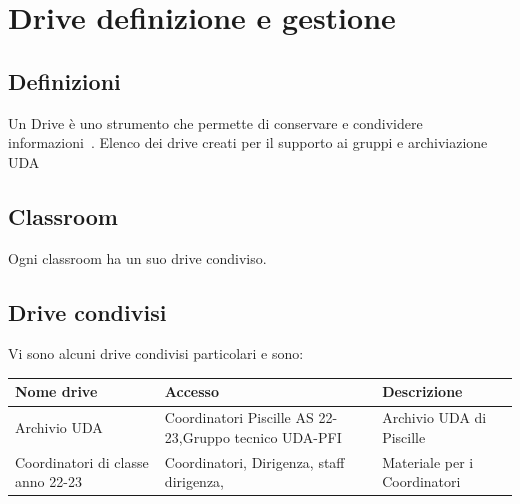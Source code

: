 \chapter{Drive definizione e gestione}
\section{Definizioni}
Un Drive è uno strumento che permette di conservare e condividere informazioni~\cite{Google2024}.
Elenco dei drive creati per il supporto ai gruppi e archiviazione UDA
\section{Classroom}
Ogni classroom  ha un suo drive condiviso.
\section{Drive condivisi}
Vi sono alcuni drive condivisi particolari e sono:

\begin{center}
	\begin{tabular}{p{3.2cm}p{3.2cm}p{3.2cm}}
\toprule
Nome drive	& Accesso &  Descrizione \\
\midrule
Archivio UDA\index{UDA!Archivio}	& Coordinatori Piscille AS 22-23,Gruppo tecnico UDA-PFI & Archivio UDA di Piscille \\
Coordinatori di classe anno 22-23&Coordinatori, Dirigenza, staff dirigenza, &Materiale per i Coordinatori\\
\bottomrule
\end{tabular}
\end{center}

